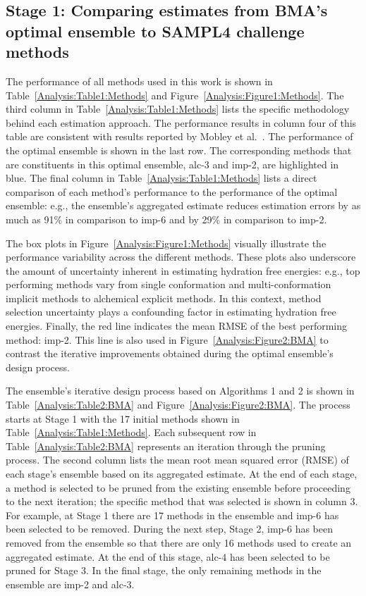 \documentclass[12pt]{article}
\newcommand{\+}[1]{\ensuremath{\mathbf{#1}}}
\begin{document}
\subsection{Stage 1: Comparing estimates from BMA's optimal ensemble to SAMPL4 challenge methods}
\label{Results:BMA_Methods}
The performance of all methods used in this work is shown in Table~\ref{Analysis:Table1:Methods} and Figure~\ref{Analysis:Figure1:Methods}.  The third column in Table~\ref{Analysis:Table1:Methods} lists the specific methodology behind each estimation approach. The performance results in column four of this table are consistent with results reported by Mobley et al.~\cite{Mobley:2014}. The performance of the optimal ensemble is shown in the last row. The corresponding methods that are constituents in this optimal ensemble, alc-3 and imp-2, are highlighted in blue. The final column in Table~\ref{Analysis:Table1:Methods} lists a direct comparison of each method's performance to the performance of the optimal ensemble: e.g., the ensemble's aggregated estimate reduces estimation errors by as much as 91\% in comparison to imp-6 and by 29\% in comparison to imp-2. 

The box plots in Figure~\ref{Analysis:Figure1:Methods} visually illustrate the performance variability across the different methods. These plots also underscore the amount of uncertainty inherent in estimating hydration free energies: e.g., top performing methods vary from single conformation and multi-conformation implicit methods to alchemical explicit methods. In this context, method selection uncertainty plays a confounding factor in estimating hydration free energies. Finally, the red line indicates the mean RMSE of the best performing method: imp-2.  This line is also used in Figure~\ref{Analysis:Figure2:BMA} to contrast the iterative improvements obtained during the optimal ensemble's design process.

The ensemble's iterative design process based on Algorithms 1 and 2 is shown in Table~\ref{Analysis:Table2:BMA} and Figure~\ref{Analysis:Figure2:BMA}.  The process starts at Stage 1 with the 17 initial methods shown in Table~\ref{Analysis:Table1:Methods}.  Each subsequent row in Table~\ref{Analysis:Table2:BMA} represents an iteration through the pruning process.  The second column lists the mean root mean squared error (RMSE) of each stage's ensemble based on its aggregated estimate.  At the end of each stage, a method is selected to be pruned from the existing ensemble before proceeding to the next iteration; the specific method that was selected is shown in column 3. For example, at Stage 1 there are 17 methods in the ensemble and imp-6 has been selected to be removed. During the next step, Stage 2, imp-6 has been removed from the ensemble so that there are only 16 methods used to create an aggregated estimate. At the end of this stage, alc-4 has been selected to be pruned for Stage 3.  In the final stage, the only remaining methods in the ensemble are imp-2 and alc-3.
\end{document}
